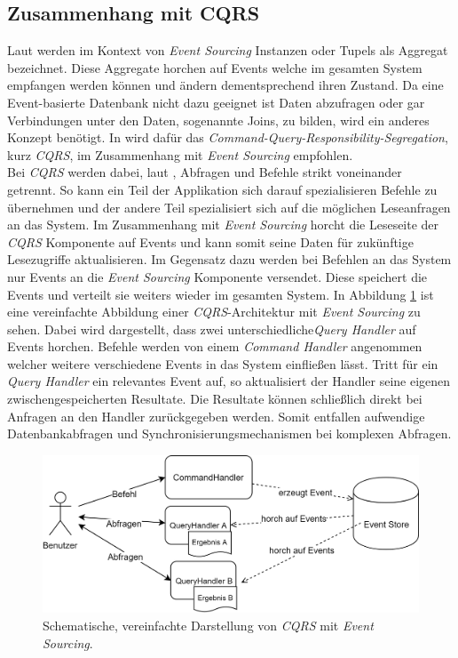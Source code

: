 \subsection{Zusammenhang mit CQRS}
\label{sub:transaction:cqrs}
Laut \cite{vernon2013implementing} werden im Kontext von \textit{Event Sourcing} Instanzen oder Tupels als Aggregat bezeichnet. Diese Aggregate horchen auf Events welche im gesamten System empfangen werden können und ändern dementsprechend ihren Zustand. Da eine Event-basierte Datenbank nicht dazu geeignet ist Daten abzufragen oder gar Verbindungen unter den Daten, sogenannte Joins, zu bilden, wird ein anderes Konzept benötigt. In \cite{vernon2013implementing} wird dafür das \textit{Command-Query-Responsibility-Segregation}, kurz \textit{CQRS}, im Zusammenhang mit \textit{Event Sourcing} empfohlen. \\
Bei \textit{CQRS} werden dabei, laut \cite{cqrsYoung2010}, Abfragen und Befehle strikt voneinander getrennt. So kann ein Teil der Applikation sich darauf spezialisieren Befehle zu übernehmen und der andere Teil spezialisiert sich auf die möglichen Leseanfragen an das System. Im Zusammenhang mit \textit{Event Sourcing} horcht die Leseseite der \textit{CQRS} Komponente auf Events und kann somit seine Daten für zukünftige Lesezugriffe aktualisieren. Im Gegensatz dazu werden bei Befehlen an das System nur Events an die \textit{Event Sourcing} Komponente versendet. Diese speichert die Events und verteilt sie weiters wieder im gesamten System. In Abbildung \ref{fig:transactionTheory:eventSourcing:cqrs} ist eine vereinfachte Abbildung einer \textit{CQRS}-Architektur mit \textit{Event Sourcing} zu sehen. Dabei wird dargestellt, dass zwei unterschiedliche\textit{Query Handler} auf Events horchen. Befehle werden von einem \textit{Command Handler} angenommen welcher weitere verschiedene Events in das System einfließen lässt. Tritt für ein \textit{Query Handler} ein relevantes Event auf, so aktualisiert der Handler seine eigenen zwischengespeicherten Resultate. Die Resultate können schließlich direkt bei Anfragen an den Handler zurückgegeben werden. Somit entfallen aufwendige Datenbankabfragen und Synchronisierungsmechanismen bei komplexen Abfragen. \\

\begin{figure}
  \centering
  \includegraphics[width=\linewidth]{gfx/other/eventSourcingCqrs}
  \caption{Schematische, vereinfachte Darstellung von \textit{CQRS} mit \textit{Event Sourcing}.}
  \label{fig:transactionTheory:eventSourcing:cqrs}
\end{figure}

